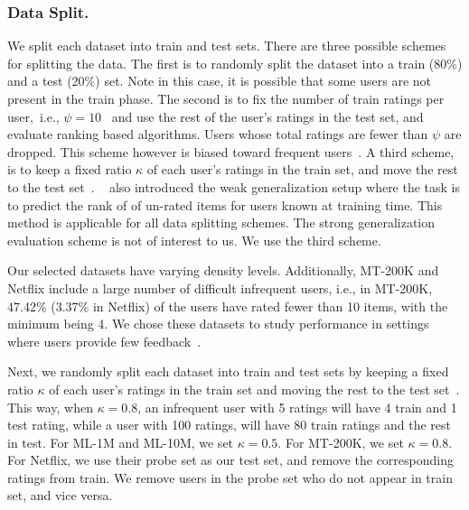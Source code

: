 \subsubsection{Data Split. }We split each dataset into train and test sets. 
There are three possible schemes for splitting the data. The first is to randomly split the dataset into a train (80\%) and a test (20\%) set. Note in this case, it is possible that some users are not present in the train phase. The second is to fix the number of train ratings per user,~i.e.,  $ \psi= 10$~\cite{lee2014local,weimer2007maximum} and use the rest of the user's ratings in the  test set, and evaluate ranking based algorithms.  Users whose total ratings are fewer than  $\psi$ are dropped. This scheme however is biased toward frequent users~\cite{lee2014local}. A third scheme, is to keep a fixed ratio $\kappa$ of each user's ratings in the train set, and move the rest to the test set~\cite{lee2014local}. ~\cite{weimer2007maximum} also introduced the  weak generalization setup where the task is to predict the rank of of un-rated items for users known at training time. This method is applicable for all data splitting schemes. The strong generalization evaluation scheme is not of interest to us.
We use the third scheme. 
\fi

Our  selected datasets  have varying density levels. Additionally,  MT-200K and Netflix  include a large number of  difficult infrequent users, i.e., in MT-200K,  47.42\% (3.37\% in Netflix) of the users have rated fewer than 10 items, with the minimum being 4. 
We chose these datasets to study performance in settings  where  users  provide few feedback~\cite{kanagal2012supercharging,liu2017experimental}.


Next,  we randomly split each dataset into train and test sets by keeping a fixed ratio $\kappa$ of each user's ratings in the train set and moving the rest to the test set~\cite{lee2014local}.  
\iffullpaper 
 This way, when $\kappa =0.8$, an infrequent user with 5 ratings will have 4 train and 1 test rating,  while  a user with  100 ratings, will have 80 train ratings and the rest in test. 
 \fi
 For ML-1M and ML-10M, we set $\kappa=0.5$.  For MT-200K, we set $\kappa=0.8$.  For Netflix, we use their probe set as our test set, and remove the  corresponding ratings from train. We remove users in the probe set who do not appear in train set, and vice versa. 



